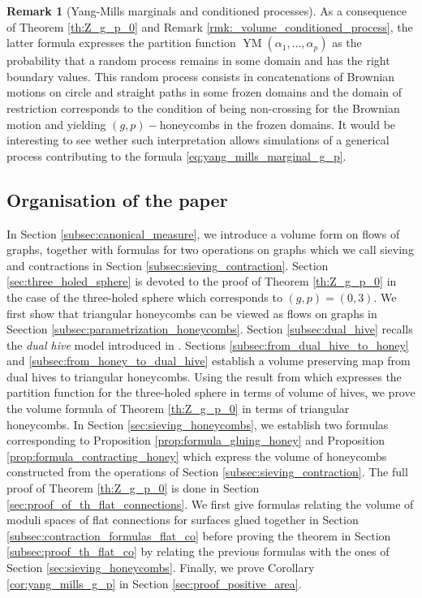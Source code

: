\documentclass[11pt,a4paper]{amsart}
\numberwithin{equation}{section}
\theoremstyle{definition}
\newtheorem{remark}[theorem]{Remark}
\begin{document}
\begin{remark}[Yang-Mills marginals and conditioned processes]\label{rmk:Yang-Mills_volume_conditioned_process}
As a consequence of Theorem \ref{th:Z_g_p_0} and Remark \ref{rmk:_volume_conditioned_process}, the latter formula expresses the partition function $ \operatorname{YM}(\alpha_1,\ldots,\alpha_p)$ as the probability that a random process remains in some domain and has the right boundary values. This random process consists in concatenations of Brownian motions on circle and straight paths in some frozen domains and the domain of restriction corresponds to the condition of being non-crossing for the Brownian motion and yielding $(g,p)-$honeycombs in the frozen domains. It would be interesting to see wether such interpretation allows simulations of a generical process contributing to the formula \eqref{eq:yang_mills_marginal_g_p}.
\end{remark}


\subsection*{Organisation of the paper} 

In Section \ref{subsec:canonical_measure}, 
we introduce a volume form on flows of graphs, together 
with formulas for two operations on graphs which we call  
sieving and contractions in Section \ref{subsec:sieving_contraction}.
Section \ref{sec:three_holed_sphere} is devoted to the proof of 
Theorem \ref{th:Z_g_p_0} in the 
case of the three-holed sphere which corresponds to $(g, p) = (0, 3)$.
We first show that triangular honeycombs can be viewed as flows on 
graphs in Seection \ref{subsec:parametrization_honeycombs}. Section 
\ref{subsec:dual_hive} recalls the \textit{dual hive} model introduced 
in \cite{françois2024positiveformulaproductconjugacy}. 
Sections \ref{subsec:from_dual_hive_to_honey} and \ref{subsec:from_honey_to_dual_hive} 
establish a volume preserving map from dual hives to triangular honeycombs. 
Using the result from \cite{françois2024positiveformulaproductconjugacy} 
which expresses the partition function for the three-holed sphere 
in terms of volume of hives, we prove the volume formula of 
Theorem \ref{th:Z_g_p_0} in terms of triangular honeycombs.
In Section \ref{sec:sieving_honeycombs}, we establish two 
formulas corresponding to Proposition \ref{prop:formula_gluing_honey} 
and Proposition \ref{prop:formula_contracting_honey} which express 
the volume of honeycombs constructed from the operations 
of Section \ref{subsec:sieving_contraction}.
The full proof of Theorem \ref{th:Z_g_p_0} is done in Section 
\ref{sec:proof_of_th_flat_connections}. 
We first give formulas relating the volume of moduli spaces of 
flat connections for surfaces glued together in 
Section \ref{subsec:contraction_formulas_flat_co} before 
proving the theorem in Section \ref{subsec:proof_th_flat_co} 
by relating the previous formulas with the ones of Section 
\ref{sec:sieving_honeycombs}. Finally, we prove Corollary \ref{cor:yang_mills_g_p} 
in Section \ref{sec:proof_positive_area}.
\end{document}
